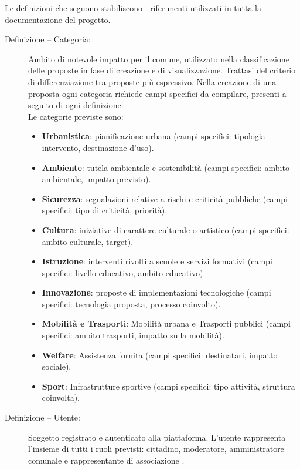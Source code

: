 Le definizioni che seguono stabiliscono i riferimenti utilizzati in tutta la documentazione del progetto.

\begin{description}

\item[Definizione \thedefinition\label{def:categoria} – Categoria:]
Ambito di notevole impatto per il comune, utilizzato nella classificazione delle proposte in fase di creazione e di visualizzazione.
Trattasi del criterio di differenziazione tra proposte più espressivo.
Nella creazione di una proposta ogni categoria richiede campi specifici da compilare, presenti a seguito di ogni definizione. \\
Le categorie previste sono:

\begin{itemize}
	\item \textbf{Urbanistica}: pianificazione urbana (campi specifici: tipologia intervento, destinazione d’uso).
	\item \textbf{Ambiente}: tutela ambientale e sostenibilità (campi specifici: ambito ambientale, impatto previsto).
	\item \textbf{Sicurezza}: segnalazioni relative a rischi e criticità pubbliche (campi specifici: tipo di criticità, priorità).
	\item \textbf{Cultura}: iniziative di carattere culturale o artistico (campi specifici: ambito culturale, target).
	\item \textbf{Istruzione}: interventi rivolti a scuole e servizi formativi (campi specifici: livello educativo, ambito educativo).
	\item \textbf{Innovazione}: proposte di implementazioni tecnologiche (campi specifici: tecnologia proposta, processo coinvolto).
	\item \textbf{Mobilità e Trasporti}: Mobilità urbana e Trasporti pubblici (campi specifici: ambito trasporti, impatto sulla mobilità).
	\item \textbf{Welfare}: Assistenza fornita (campi specifici: destinatari, impatto sociale).
	\item \textbf{Sport}: Infrastrutture sportive (campi specifici: tipo attività, struttura coinvolta).
\end{itemize}

\item[Definizione \thedefinition\label{def:utente} – Utente:]
  Soggetto registrato e autenticato alla piattaforma.
  L'utente rappresenta l'insieme di tutti i ruoli previsti: cittadino, moderatore, amministratore comunale e rappresentante di associazione .


\end{description}
